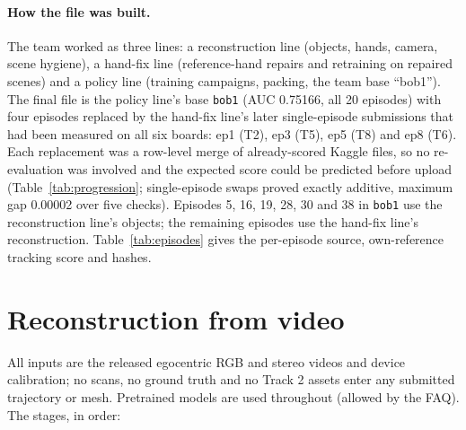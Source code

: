 \documentclass[10pt,a4paper]{article}
\newcommand{\code}[1]{\texttt{#1}}
\begin{document}
\paragraph{How the file was built.} The team worked as three lines: a reconstruction line (objects, hands, camera, scene hygiene), a hand-fix line (reference-hand repairs and retraining on repaired scenes) and a policy line (training campaigns, packing, the team base ``bob1''). The final file is the policy line's base \code{bob1} (AUC 0.75166, all 20 episodes) with four episodes replaced by the hand-fix line's later single-episode submissions that had been measured on all six boards: ep1 (T2), ep3 (T5), ep5 (T8) and ep8 (T6). Each replacement was a row-level merge of already-scored Kaggle files, so no re-evaluation was involved and the expected score could be predicted before upload (Table~\ref{tab:progression}; single-episode swaps proved exactly additive, maximum gap 0.00002 over five checks). Episodes 5, 16, 19, 28, 30 and 38 in \code{bob1} use the reconstruction line's objects; the remaining episodes use the hand-fix line's reconstruction. Table~\ref{tab:episodes} gives the per-episode source, own-reference tracking score and hashes.

\begin{table}[h]\centering\small
\caption{Progression of the team's best file. ``Predicted'' is the row-level sum of the already-scored parts before upload.}
\label{tab:progression}

\end{table}

\section{Reconstruction from video}
\label{sec:recon}

All inputs are the released egocentric RGB and stereo videos and device calibration; no scans, no ground truth and no Track 2 assets enter any submitted trajectory or mesh. Pretrained models are used throughout (allowed by the FAQ). The stages, in order:
\end{document}
